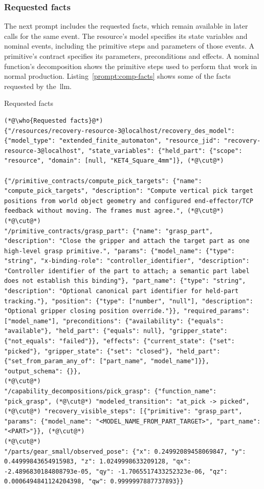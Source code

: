 \subsubsection{Requested facts}\label{sec:comp-facts}

The next prompt includes the requested facts, which remain available in later calls for the same
event. The resource's model specifies its state variables and nominal events, including the
primitive steps and parameters of those events. A primitive's contract specifies its parameters,
preconditions and effects. A nominal function's decomposition shows the primitive steps used to
perform that work in normal production. Listing~\ref{prompt:comp-facts} shows some of the facts
requested by the~\gls{llm}.

\begin{recbox}{Requested facts}
\begin{lstlisting}
(*@\who{Requested facts}@*)
{"/resources/recovery-resource-3@localhost/recovery_des_model": {"model_type": "extended_finite_automaton", "resource_jid": "recovery-resource-3@localhost", "state_variables": {"held_part": {"scope": "resource", "domain": [null, "KET4_Square_4mm"]}, (*@\cut@*)

{"/primitive_contracts/compute_pick_targets": {"name": "compute_pick_targets", "description": "Compute vertical pick target positions from world object geometry and configured end-effector/TCP feedback without moving. The frames must agree.", (*@\cut@*)
(*@\cut@*)
"/primitive_contracts/grasp_part": {"name": "grasp_part", "description": "Close the gripper and attach the target part as one high-level grasp primitive.", "params": {"model_name": {"type": "string", "x-binding-role": "controller_identifier", "description": "Controller identifier of the part to attach; a semantic part label does not establish this binding"}, "part_name": {"type": "string", "description": "Optional canonical part identifier for held-part tracking."}, "position": {"type": ["number", "null"], "description": "Optional gripper closing position override."}}, "required_params": ["model_name"], "preconditions": {"availability": {"equals": "available"}, "held_part": {"equals": null}, "gripper_state": {"not_equals": "failed"}}, "effects": {"current_state": {"set": "picked"}, "gripper_state": {"set": "closed"}, "held_part": {"set_from_param_any_of": ["part_name", "model_name"]}}, "output_schema": {}},
(*@\cut@*)
"/capability_decompositions/pick_grasp": {"function_name": "pick_grasp", (*@\cut@*) "modeled_transition": "at_pick -> picked", (*@\cut@*) "recovery_visible_steps": [{"primitive": "grasp_part", "params": {"model_name": "<MODEL_NAME_FROM_PART_TARGET>", "part_name": "<PART>"}}, (*@\cut@*)
(*@\cut@*)
"/parts/gear_small/observed_pose": {"x": 0.24992089458069847, "y": 0.44999843654915983, "z": 1.0249998633209128, "qx": -2.4896830184808793e-05, "qy": -1.7065517433252323e-06, "qz": 0.0006494841124204398, "qw": 0.9999997887737893}}
\end{lstlisting}
\end{recbox}

